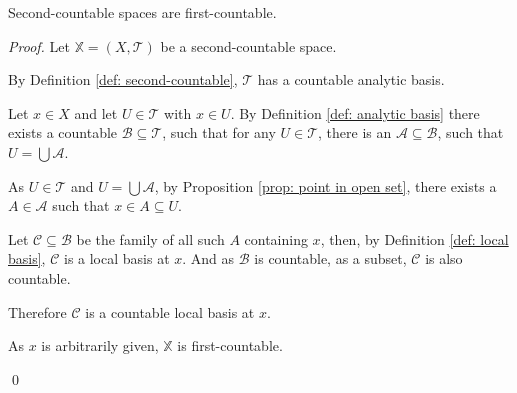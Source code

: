 \begin{proposition}
	Second-countable spaces are first-countable.
	
	\begin{proof}
		Let $\mathbb X = (X, \mathcal T)$ be a second-countable space.
	
		By Definition \ref{def: second-countable}, $\mathcal T$ has a countable analytic basis.
		
		Let $x \in X$ and let $U \in \mathcal T$ with $x \in U$. By Definition \ref{def: analytic basis} there exists a countable $\mathcal B \subseteq \mathcal T$, such that for any $U \in \mathcal T$, there is an $\mathcal A \subseteq \mathcal B$, such that $U = \bigcup \mathcal A$. 
		
		As $U \in \mathcal T$ and $U = \bigcup \mathcal A$, by Proposition \ref{prop: point in open set}, there exists a $A \in \mathcal A$ such that $x \in A \subseteq U$.
		
		Let $\mathcal C \subseteq \mathcal B$ be the family of all such $A$ containing $x$, then, by Definition \ref{def: local basis}, $\mathcal C$ is a local basis at $x$. And as $\mathcal B$ is countable, as a subset, $\mathcal C$ is also countable.
		
		Therefore $\mathcal C$ is a countable local basis at $x$.
		
		As $x$ is arbitrarily given, $\mathbb X$ is first-countable.
		
		\qed
	\end{proof}
\end{proposition}

